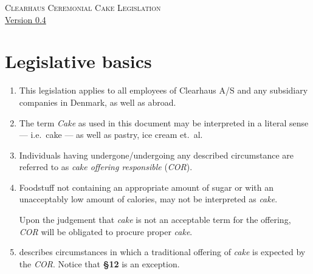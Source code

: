 \documentclass[a4paper, oneside, article]{memoir}
\newcounter{tbc}
\begin{document}
\thispagestyle{empty} %
\begin{center}
  \textsc{\huge Clearhaus Ceremonial Cake Legislation}
  \\
  {\footnotesize \href{https://semver.org/}{Version 0.4}}
\end{center}

\chapter{Legislative basics}

\begin{enumerate}[§ 1]
  \item This legislation applies to all employees of Clearhaus {\small A/S} and
    any subsidiary companies in Denmark, as well as abroad.

  \item The term \emph{Cake} as used in this document may be
    interpreted in a literal sense --- i.e.\ cake --- as well as pastry, ice
    cream et.\ al.
    
  \item Individuals having undergone/undergoing any described circumstance are 
    referred to as \emph{cake offering responsible} (\emph{COR}).

  \item Foodstuff not containing an appropriate amount of sugar or with an
    unacceptably low amount of calories, may not be interpreted as
    \emph{cake}.

    Upon the judgement that \emph{cake} is not an acceptable term for the
    offering, \emph{COR} will be obligated to procure proper \emph{cake}.

  \item {} describes circumstances in which a traditional
    offering of \emph{cake} is expected by the \emph{COR}. Notice that
    \textbf{§12} is an exception.

  \setcounter{tbc}{\value{enumi}}
\end{enumerate}
\end{document}
